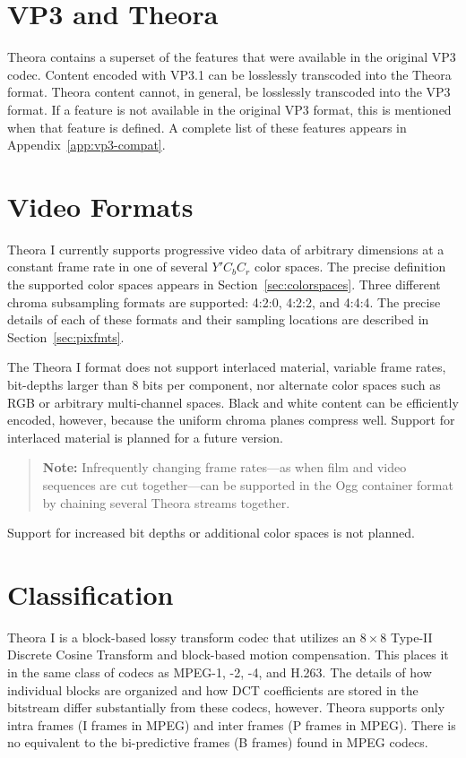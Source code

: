 \documentclass[9pt,letterpaper]{book}
\numberwithin{equation}{chapter}
\numberwithin{figure}{chapter}
\numberwithin{table}{chapter}
\begin{document}
\section{VP3 and Theora}

Theora contains a superset of the features that were available in the original
 VP3 codec.
Content encoded with VP3.1 can be losslessly transcoded into the Theora format.
Theora content cannot, in general, be losslessly transcoded into the VP3
 format.
If a feature is not available in the original VP3 format, this is mentioned
 when that feature is defined.
A complete list of these features appears in Appendix~\ref{app:vp3-compat}.

\section{Video Formats}

Theora I currently supports progressive video data of arbitrary dimensions at a
 constant frame rate in one of several $Y'C_bC_r$ color spaces.
The precise definition the supported color spaces appears in
 Section~\ref{sec:colorspaces}.
Three different chroma subsampling formats are supported: 4:2:0, 4:2:2,
 and 4:4:4.
The precise details of each of these formats and their sampling locations are
 described in Section~\ref{sec:pixfmts}.

The Theora I format does not support interlaced material, variable frame rates,
 bit-depths larger than 8 bits per component, nor alternate color spaces such
 as RGB or arbitrary multi-channel spaces.
Black and white content can be efficiently encoded, however, because the
 uniform chroma planes compress well.
Support for interlaced material is planned for a future version.
\begin{verse}
{\bf Note:} Infrequently changing frame rates---as when film and video
 sequences are cut together---can be supported in the Ogg container format by
 chaining several Theora streams together.
\end{verse}
Support for increased bit depths or additional color spaces is not planned.

\section{Classification}

Theora I is a block-based lossy transform codec that utilizes an
 $8\times 8$ Type-II Discrete Cosine Transform and block-based motion
 compensation.
This places it in the same class of codecs as MPEG-1, -2, -4, and H.263.
The details of how individual blocks are organized and how DCT coefficients are
 stored in the bitstream differ substantially from these codecs, however.
Theora supports only intra frames (I frames in MPEG) and inter frames (P frames
 in MPEG).
There is no equivalent to the bi-predictive frames (B frames) found in MPEG
 codecs.
\end{document}
